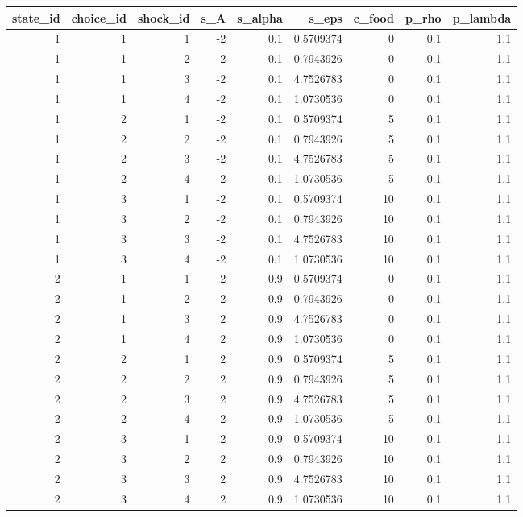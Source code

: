 \documentclass[
]{book}
\begin{document}
\begin{table}[!h]
\centering
\begin{tabular}{r|r|r|r|r|r|r|r|r}
\hline
state\_id & choice\_id & shock\_id & s\_A & s\_alpha & s\_eps & c\_food & p\_rho & p\_lambda\\
\hline
\rowcolor{gray!6}  1 & 1 & 1 & -2 & 0.1 & 0.5709374 & 0 & 0.1 & 1.1\\
\hline
1 & 1 & 2 & -2 & 0.1 & 0.7943926 & 0 & 0.1 & 1.1\\
\hline
\rowcolor{gray!6}  1 & 1 & 3 & -2 & 0.1 & 4.7526783 & 0 & 0.1 & 1.1\\
\hline
1 & 1 & 4 & -2 & 0.1 & 1.0730536 & 0 & 0.1 & 1.1\\
\hline
\rowcolor{gray!6}  1 & 2 & 1 & -2 & 0.1 & 0.5709374 & 5 & 0.1 & 1.1\\
\hline
1 & 2 & 2 & -2 & 0.1 & 0.7943926 & 5 & 0.1 & 1.1\\
\hline
\rowcolor{gray!6}  1 & 2 & 3 & -2 & 0.1 & 4.7526783 & 5 & 0.1 & 1.1\\
\hline
1 & 2 & 4 & -2 & 0.1 & 1.0730536 & 5 & 0.1 & 1.1\\
\hline
\rowcolor{gray!6}  1 & 3 & 1 & -2 & 0.1 & 0.5709374 & 10 & 0.1 & 1.1\\
\hline
1 & 3 & 2 & -2 & 0.1 & 0.7943926 & 10 & 0.1 & 1.1\\
\hline
\rowcolor{gray!6}  1 & 3 & 3 & -2 & 0.1 & 4.7526783 & 10 & 0.1 & 1.1\\
\hline
1 & 3 & 4 & -2 & 0.1 & 1.0730536 & 10 & 0.1 & 1.1\\
\hline
\rowcolor{gray!6}  2 & 1 & 1 & 2 & 0.9 & 0.5709374 & 0 & 0.1 & 1.1\\
\hline
2 & 1 & 2 & 2 & 0.9 & 0.7943926 & 0 & 0.1 & 1.1\\
\hline
\rowcolor{gray!6}  2 & 1 & 3 & 2 & 0.9 & 4.7526783 & 0 & 0.1 & 1.1\\
\hline
2 & 1 & 4 & 2 & 0.9 & 1.0730536 & 0 & 0.1 & 1.1\\
\hline
\rowcolor{gray!6}  2 & 2 & 1 & 2 & 0.9 & 0.5709374 & 5 & 0.1 & 1.1\\
\hline
2 & 2 & 2 & 2 & 0.9 & 0.7943926 & 5 & 0.1 & 1.1\\
\hline
\rowcolor{gray!6}  2 & 2 & 3 & 2 & 0.9 & 4.7526783 & 5 & 0.1 & 1.1\\
\hline
2 & 2 & 4 & 2 & 0.9 & 1.0730536 & 5 & 0.1 & 1.1\\
\hline
\rowcolor{gray!6}  2 & 3 & 1 & 2 & 0.9 & 0.5709374 & 10 & 0.1 & 1.1\\
\hline
2 & 3 & 2 & 2 & 0.9 & 0.7943926 & 10 & 0.1 & 1.1\\
\hline
\rowcolor{gray!6}  2 & 3 & 3 & 2 & 0.9 & 4.7526783 & 10 & 0.1 & 1.1\\
\hline
2 & 3 & 4 & 2 & 0.9 & 1.0730536 & 10 & 0.1 & 1.1\\
\hline
\end{tabular}
\end{table}
\end{document}
